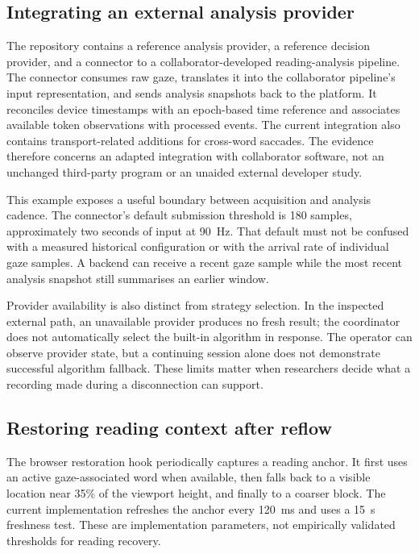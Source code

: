 \subsection{Integrating an external analysis provider}

The repository contains a reference analysis provider, a reference decision provider, and a connector to a collaborator-developed reading-analysis pipeline. The connector consumes raw gaze, translates it into the collaborator pipeline's input representation, and sends analysis snapshots back to the platform. It reconciles device timestamps with an epoch-based time reference and associates available token observations with processed events. The current integration also contains transport-related additions for cross-word saccades. The evidence therefore concerns an adapted integration with collaborator software, not an unchanged third-party program or an unaided external developer study.

This example exposes a useful boundary between acquisition and analysis cadence. The connector's default submission threshold is 180 samples, approximately two seconds of input at 90~Hz. That default must not be confused with a measured historical configuration or with the arrival rate of individual gaze samples. A backend can receive a recent gaze sample while the most recent analysis snapshot still summarises an earlier window.

Provider availability is also distinct from strategy selection. In the inspected external path, an unavailable provider produces no fresh result; the coordinator does not automatically select the built-in algorithm in response. The operator can observe provider state, but a continuing session alone does not demonstrate successful algorithm fallback. These limits matter when researchers decide what a recording made during a disconnection can support.

\subsection{Restoring reading context after reflow}

The browser restoration hook periodically captures a reading anchor. It first uses an active gaze-associated word when available, then falls back to a visible location near 35\% of the viewport height, and finally to a coarser block. The current implementation refreshes the anchor every 120~ms and uses a 15~s freshness test. These are implementation parameters, not empirically validated thresholds for reading recovery.

